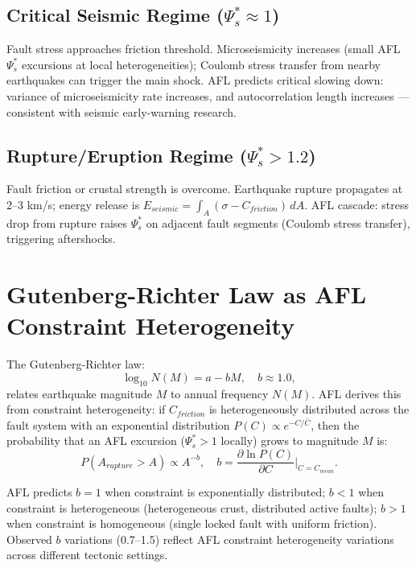 \documentclass[11pt]{article}
\begin{document}
\subsection{Critical Seismic Regime ($\Psi_s^* \approx 1$)}

Fault stress approaches friction threshold. Microseismicity increases (small AFL $\Psi_s^*$ excursions
at local heterogeneities); Coulomb stress transfer from nearby earthquakes can trigger the main
shock. AFL predicts critical slowing down: variance of microseismicity rate increases, and
autocorrelation length increases --- consistent with seismic early-warning research.

\subsection{Rupture/Eruption Regime ($\Psi_s^* > 1.2$)}

Fault friction or crustal strength is overcome. Earthquake rupture propagates at 2--3 km/s;
energy release is $E_{seismic} = \int_A (\sigma - C_{friction}) \, dA$. AFL cascade: stress
drop from rupture raises $\Psi_s^*$ on adjacent fault segments (Coulomb stress transfer), triggering
aftershocks.

\section{Gutenberg-Richter Law as AFL Constraint Heterogeneity}

The Gutenberg-Richter law:
\begin{equation}
\log_{10} N(M) = a - b M, \quad b \approx 1.0,
\end{equation}
relates earthquake magnitude $M$ to annual frequency $N(M)$. AFL derives this from constraint
heterogeneity: if $C_{friction}$ is heterogeneously distributed across the fault system with
an exponential distribution $P(C) \propto e^{-C/\bar{C}}$, then the probability that an AFL
excursion ($\Psi_s^* > 1$ locally) grows to magnitude $M$ is:
\begin{equation}
P(A_{rupture} > A) \propto A^{-b}, \quad b = \frac{\partial \ln P(C)}{\partial C} \bigg|_{C=C_{mean}}.
\end{equation}

AFL predicts $b = 1$ when constraint is exponentially distributed; $b < 1$ when constraint is
heterogeneous (heterogeneous crust, distributed active faults); $b > 1$ when constraint is
homogeneous (single locked fault with uniform friction). Observed $b$ variations (0.7--1.5)
reflect AFL constraint heterogeneity variations across different tectonic settings.
\end{document}
